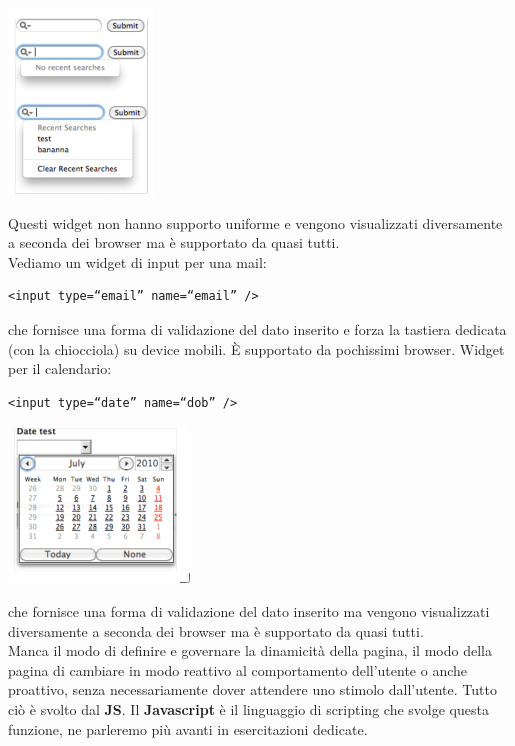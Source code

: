 \documentclass[a4paper,12pt, oneside]{book}
\begin{document}
\begin{center}
\includegraphics[scale=0.8]{img/see.png}
\end{center}
Questi widget non hanno supporto uniforme e vengono visualizzati diversamente a seconda dei browser ma è supportato da quasi tutti.\\
Vediamo un widget di input per una mail:
\begin{verbatim}
<input type=“email” name=“email” />
\end{verbatim}
che fornisce una forma di validazione del dato inserito e forza la tastiera dedicata (con la chiocciola) su device mobili. È supportato da pochissimi browser.
\newpage
Widget per il calendario:
\begin{verbatim}
<input type=“date” name=“dob” />
\end{verbatim}
\begin{center}
\includegraphics[scale=0.9]{img/date.png}
\end{center}
che fornisce una forma di validazione del dato inserito ma vengono visualizzati diversamente a seconda dei browser ma è supportato da quasi tutti.\\
Manca il modo di definire e governare la dinamicità della pagina, il modo
della pagina di cambiare in modo reattivo al comportamento dell'utente o anche proattivo, senza necessariamente dover attendere uno stimolo dall'utente. Tutto ciò è svolto dal\textbf{ JS}. Il \textbf{Javascript} è il linguaggio di scripting che svolge questa funzione, ne parleremo più avanti in esercitazioni dedicate.\\
\end{document}
